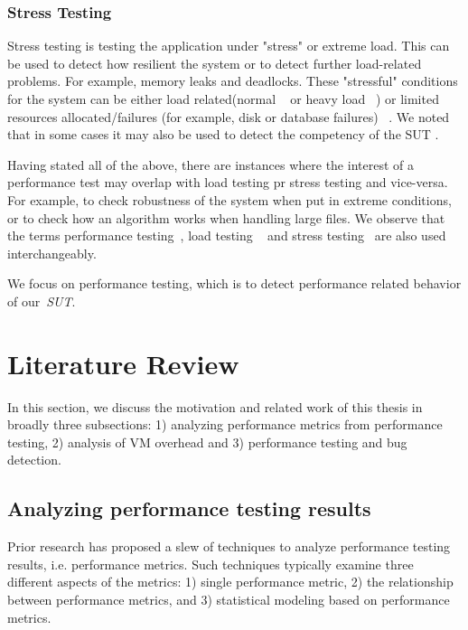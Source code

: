\subsubsection{Stress Testing}

Stress testing is testing the application under "stress" or extreme load. This can be used to detect how resilient the system or to detect further load-related problems. For example, memory leaks and deadlocks. These "stressful" conditions for the system can be either load related(normal ~\cite{zhang2002automated,kalita2011investigation,chakravarty2010stress} or heavy load ~\cite{Dillenseger2009,kalita2011investigation,huebner2001performance}) or limited resources allocated/failures (for example, disk or database failures) ~\cite{acharya2009mining}. We noted that in some cases it may also be used to detect the competency of the SUT \cite{garousi2010genetic,garousi2008empirical,garousi2006traffic,garousi2008traffic}.


Having stated all of the above, there are instances where the interest of a performance test may overlap with load testing pr stress testing and vice-versa. For example, to check robustness of the system when put in extreme conditions, or to check how an algorithm works when handling large files. We observe that the terms performance testing~\cite{Dillenseger2009,Menasce02loadtesting,Menasce:2002}, load testing ~\cite{536461,Bayan:2008,perf_load_stress,perf_web} and stress testing~\cite{Bayan:2008,Yang:1996,4020172} are also used interchangeably. 

We focus on performance testing, which is to detect performance related behavior of our~\textit{SUT}.


\section{Literature Review}
\label{sec:related}
In this section, we discuss the motivation and related work of this thesis in broadly three subsections: 1) analyzing performance metrics from performance testing, 2) analysis of VM overhead and 3) performance testing and bug detection.


\subsection{Analyzing performance testing results} 

Prior research has proposed a slew of techniques to analyze performance testing results, i.e. performance metrics. Such techniques typically examine three different aspects of the metrics: 1) single performance metric, 2) the relationship between performance metrics, and 3) statistical modeling based on performance metrics.


